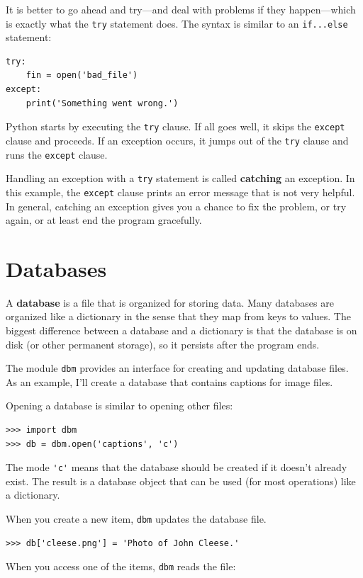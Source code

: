 \documentclass[10pt]{book}
\begin{document}
It is better to go ahead and try---and deal with problems if they
happen---which is exactly what the {\tt try} statement does.  The
syntax is similar to an {\tt if...else} statement:

\begin{verbatim}
try:
    fin = open('bad_file')
except:
    print('Something went wrong.')
\end{verbatim}
%
Python starts by executing the {\tt try} clause.  If all goes
well, it skips the {\tt except} clause and proceeds.  If an
exception occurs, it jumps out of the {\tt try} clause and
runs the {\tt except} clause.

Handling an exception with a {\tt try} statement is called {\bf
catching} an exception.  In this example, the {\tt except} clause
prints an error message that is not very helpful.  In general,
catching an exception gives you a chance to fix the problem, or try
again, or at least end the program gracefully.


\section{Databases}

A {\bf database} is a file that is organized for storing data.  Many
databases are organized like a dictionary in the sense that they map
from keys to values.  The biggest difference between a database and a
dictionary is that the database is on disk (or other permanent
storage), so it persists after the program ends.   

The module {\tt dbm} provides an interface for creating
and updating database files.
As an example, I'll create a database
that contains captions for image files.

Opening a database is similar to opening other files:

\begin{verbatim}
>>> import dbm
>>> db = dbm.open('captions', 'c')
\end{verbatim}
%
The mode \verb"'c'" means that the database should be created if
it doesn't already exist.  The result is a database object
that can be used (for most operations) like a dictionary.

When you create a new item, {\tt dbm} updates the database file.

\begin{verbatim}
>>> db['cleese.png'] = 'Photo of John Cleese.'
\end{verbatim}
%
When you access one of the items, {\tt dbm} reads the file:
\end{document}
